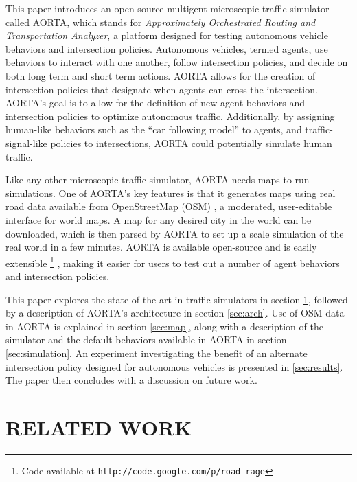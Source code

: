 \documentclass[letterpaper, 10 pt, conference]{ieeeconf}  %
\begin{document}

This paper introduces an open source multigent microscopic traffic simulator
called AORTA, which stands for \textit{Approximately Orchestrated Routing and
Transportation Analyzer}, a platform designed for testing autonomous vehicle
behaviors and intersection policies. Autonomous vehicles, termed agents, use
behaviors to interact with one another, follow intersection policies, and decide
on both long term and short term actions. AORTA allows for the creation of
intersection policies that designate when agents can cross the intersection.
AORTA's goal is to allow for the definition of new agent behaviors and
intersection policies to optimize autonomous traffic. Additionally, by
assigning human-like behaviors such as the ``car following model''
\cite{brackstone1999car} to agents, and traffic-signal-like policies to
intersections, AORTA could potentially simulate human traffic.

Like any other microscopic traffic simulator, AORTA needs maps to run
simulations. One of AORTA's key features is that it generates maps using real
road data available from OpenStreetMap (OSM) \cite{osm}, a moderated,
user-editable interface for world maps. A map for any desired city in the world
can be downloaded, which is then parsed by AORTA to set up a scale simulation of
the real world in a few minutes. AORTA is available open-source and is easily
extensible \footnote{Code available at
\texttt{http://code.google.com/p/road-rage}} , making it easier for users to test out a number of agent
behaviors and intersection policies.

This paper explores the state-of-the-art in traffic simulators in section
\ref{sec:related_work}, followed by a description of AORTA's architecture in
section \ref{sec:arch}.  Use of OSM data in AORTA is explained in section
\ref{sec:map}, along with a description of the simulator and the default
behaviors available in AORTA in section \ref{sec:simulation}. An experiment
investigating the benefit of an alternate intersection policy designed for
autonomous vehicles is presented in \ref{sec:results}. The paper then concludes
with a discussion on future work.


\section{RELATED WORK}
\label{sec:related_work}
\end{document}
